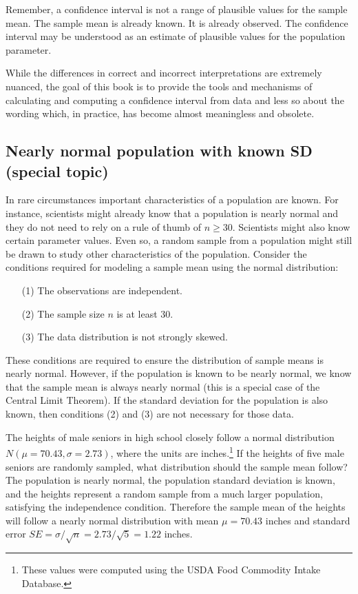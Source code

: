 Remember, a confidence interval is not a range of plausible values for the sample mean. The sample mean is already known. It is already observed. The confidence interval may be understood as an estimate of plausible values for the population parameter.

While the differences in correct and incorrect interpretations are extremely nuanced, the goal of this book is to provide the tools and mechanisms of calculating and computing a confidence interval from data and less so about the wording which, in practice, has become almost meaningless and obsolete. 


\subsection[Nearly normal population with known SD (special topic)]{Nearly normal population with known SD (special topic)}
\label{nearlyNormalPopWithKnownSD}


In rare circumstances important characteristics of a population are known. For instance, scientists might already know that a population is nearly normal and they do not need to rely on a rule of thumb of $n\geq 30$. Scientists might also know certain parameter values. Even so, a random sample from a population might still be drawn to study other characteristics of the population. Consider the conditions required for modeling a sample mean using the normal distribution:
\begin{enumerate}
\setlength{\itemsep}{0mm}
\item[(1)] The observations are independent.
\item[(2)] The sample size $n$ is at least 30.
\item[(3)] The data distribution is not strongly skewed.
\end{enumerate}
These conditions are required to ensure the distribution of sample means is nearly normal. However, if the population is known to be nearly normal, we know that the sample mean is always nearly normal (this is a special case of the Central Limit Theorem). If the standard deviation for the population is also known, then conditions (2) and (3) are not necessary for those data. 
\begin{example}{The heights of male seniors in high school closely follow a normal distribution $N(\mu=70.43, \sigma=2.73)$, where the units are inches.\footnote{These values were computed using the USDA Food Commodity Intake Database.} If the heights of five male seniors are randomly sampled, what distribution should the sample mean follow?}\label{simpleSampleOfFiveMaleSeniors}
The population is nearly normal, the population standard deviation is known, and the heights represent a random sample from a much larger population, satisfying the independence condition. Therefore the sample mean of the heights will follow a nearly normal distribution with mean $\mu=70.43$ inches and standard error $SE=\sigma/\sqrt{n} = 2.73/\sqrt{5}=1.22$ inches.
\end{example}

